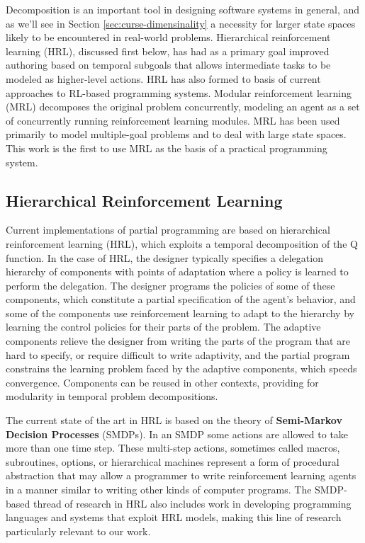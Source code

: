 Decomposition is an important tool in designing software systems in general, and as we'll see in Section \ref{sec:curse-dimensinality} a necessity for larger state spaces likely to be encountered in real-world problems. Hierarchical reinforcement learning (HRL), discussed first below, has had as a primary goal improved authoring based on temporal subgoals that allows intermediate tasks to be modeled as higher-level actions. HRL has also formed to basis of current approaches to RL-based programming systems. Modular reinforcement learning (MRL) decomposes the original problem concurrently, modeling an agent as a set of concurrently running reinforcement learning modules. MRL has been used primarily to model multiple-goal problems and to deal with large state spaces. This work is the first to use MRL as the basis of a practical programming system.

\subsection{Hierarchical Reinforcement Learning}

Current implementations of partial programming are based on hierarchical reinforcement learning (HRL), which exploits a temporal decomposition of the Q function.  In the case of HRL, the designer typically specifies a delegation hierarchy of components with points of adaptation where a policy is learned to perform the delegation.  The designer programs the policies of some of these components, which constitute a partial specification of the agent's behavior, and some of the components use reinforcement learning to adapt to the hierarchy by learning the control policies for their parts of the problem.  The adaptive components relieve the designer from writing the parts of the program that are hard to specify, or require difficult to write adaptivity, and the partial program constrains the learning problem faced by the adaptive components, which speeds convergence.  Components can be reused in other contexts, providing for modularity in temporal problem decompositions.

The current state of the art in HRL is based on the theory of {\bf Semi-Markov Decision Processes} (SMDPs). In an SMDP some actions are allowed to take more than one time step. These multi-step actions, sometimes called macros, subroutines, options, or hierarchical machines represent a form of procedural abstraction that may allow a programmer to write reinforcement learning agents in a manner similar to writing other kinds of computer programs. The SMDP-based thread of research in HRL also includes work in developing programming languages and systems that exploit HRL models, making this line of research particularly relevant to our work.

